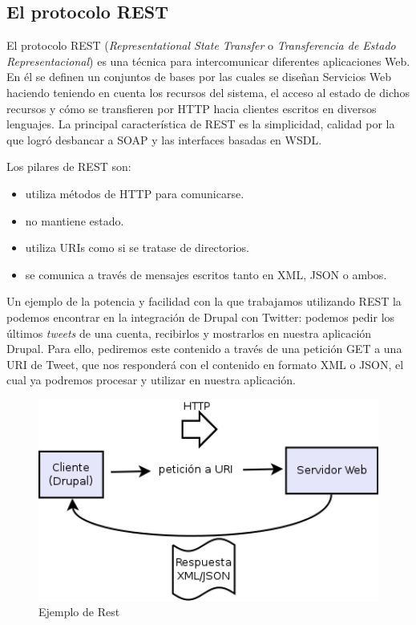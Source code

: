 \subsection{\large{El protocolo REST}}

El protocolo REST (\textit{Representational State Transfer} o \textit{Transferencia de Estado Representacional}) 
es una técnica para intercomunicar diferentes aplicaciones Web. En él se definen un conjuntos de bases por las cuales
se diseñan Servicios Web haciendo teniendo en cuenta los recursos del sistema, el acceso al estado de dichos 
recursos y cómo se transfieren por HTTP hacia clientes escritos en diversos lenguajes. La principal 
característica de REST es la simplicidad, calidad por la que logró desbancar a SOAP y las interfaces basadas 
en WSDL.

Los pilares de REST son:

\begin{itemize}
  \item utiliza métodos de HTTP para comunicarse.
  \item no mantiene estado.
  \item utiliza URIs como si se tratase de directorios.
  \item se comunica a través de mensajes escritos tanto en XML, JSON o ambos.
\end{itemize}

Un ejemplo de la potencia y facilidad con la que trabajamos utilizando REST la podemos encontrar en la integración 
de Drupal con Twitter: podemos pedir los últimos \textit{tweets} de una cuenta, recibirlos y mostrarlos en 
nuestra aplicación Drupal. Para ello, pediremos este contenido a través de una petición GET a una URI 
de Tweet, que nos responderá con el contenido en formato XML o JSON, el cual ya podremos procesar y 
utilizar en nuestra aplicación. 
 
\begin{figure}
  \centering
    \includegraphics[width=1\textwidth]{Assets/Introduccion/Imagenes/diagrama_servicios_web.png}
  \caption{Ejemplo de Rest}
\end{figure}

